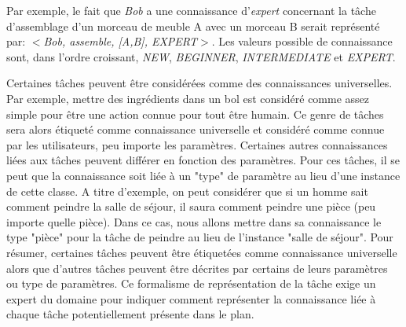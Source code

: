 \documentclass[a4paper,11pt,twoside]{StyleThese}
\begin{document}

%
Par exemple, le fait que \textit{Bob} a une connaissance d'\textit{expert} concernant la tâche d'assemblage d'un morceau de meuble A avec un morceau B serait représenté par:
\textit{$<$Bob, assemble, [A,B], EXPERT$>$}.
Les valeurs possible de connaissance sont, dans l'ordre croissant, \textit{NEW}, \textit{BEGINNER}, \textit{INTERMEDIATE} et \textit{EXPERT}. 

Certaines tâches peuvent être considérées comme des connaissances universelles. Par exemple, mettre des ingrédients dans un bol est considéré comme assez simple pour être une action connue pour tout être humain. Ce genre de tâches sera alors étiqueté comme connaissance universelle et considéré comme connue par les utilisateurs, peu importe les paramètres. Certaines autres connaissances liées aux tâches peuvent différer en fonction des paramètres. Pour ces tâches, il se peut que la connaissance soit liée à un "type" de paramètre au lieu d'une instance de cette classe.
A titre d'exemple, on peut considérer que si un homme sait comment peindre la salle de séjour, il saura comment peindre une pièce (peu importe quelle pièce). Dans ce cas, nous allons mettre dans sa connaissance le type "pièce" pour la tâche de peindre au lieu de l'instance "salle de séjour".
Pour résumer, certaines tâches peuvent être étiquetées comme connaissance universelle alors que d'autres tâches peuvent être décrites par certains de leurs paramètres ou type de paramètres.
Ce formalisme de représentation de la tâche exige un expert du domaine pour indiquer comment représenter la connaissance liée à chaque tâche potentiellement présente dans le plan.

\end{document}
